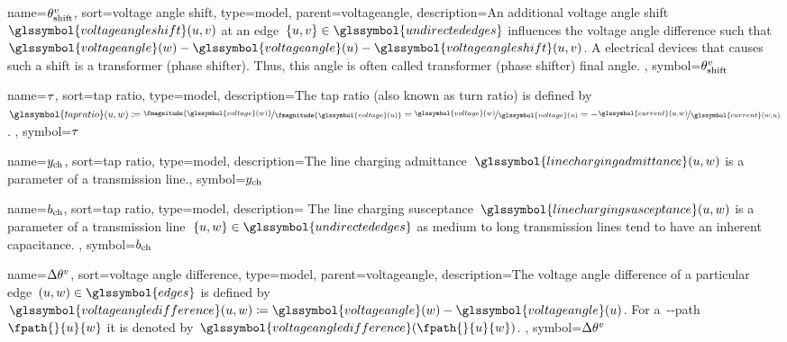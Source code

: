 {
    name={\ensuremath{\vangleshift}},
    sort={voltage angle shift},
    type={model},
    parent={voltageangle},
    description={An additional voltage angle
    shift~$\glssymbol{voltageangleshift}(\vertexa,\vertexb)$ at an edge~$
    \{\vertexa,\vertexb\}\in\glssymbol{undirectededges}$ influences the voltage
    angle difference such that~$\glssymbol{voltageangle}(\vertexc)-
    \glssymbol{voltageangle}(\vertexa)-\glssymbol{voltageangleshift}
    (\vertexa,\vertexb)$. A electrical devices that causes such a shift is a
    transformer (phase shifter). Thus, this angle is often called transformer
    (phase shifter) final angle.
    },
    symbol={\ensuremath{\vangleshift}}
}

{
    name={\ensuremath{\tapratio}},
    sort={tap ratio},
    type={model},
    description={The tap ratio (also known as turn ratio) is defined by~$\glssymbol{tapratio}(\vertexa,\vertexc)\coloneqq\nicefrac{\fmagnitude{
    \glssymbol{voltage}(\vertexc)}} {\fmagnitude{\glssymbol{voltage}(\vertexa)}} =
    \nicefrac{\glssymbol{voltage}(\vertexc)}{\glssymbol{voltage} (\vertexa)} = -
    \nicefrac{\glssymbol{current}(\vertexa, \vertexc)}{\glssymbol{current} (\vertexc, \vertexa)}$.
    },
    symbol={\ensuremath{\tapratio}}
}


{
    name={\ensuremath{\linechargingadmittance}},
    sort={tap ratio},
    type={model},
    description={The line charging
    admittance~$\glssymbol{linechargingadmittance}(\vertexa,\vertexc)$ is a
    parameter of a transmission line.},
    symbol={\ensuremath{\linechargingadmittance}}
}

{
    name={\ensuremath{\linechargingsusceptance}},
    sort={tap ratio},
    type={model},
    description={ The line charging
    susceptance~$\glssymbol{linechargingsusceptance}(\vertexa,\vertexc)$ is a
    parameter of a transmission
    line~$\{\vertexa,\vertexc\}\in\glssymbol{undirectededges}$ as medium to long
    transmission lines tend to have an inherent capacitance. 
    },
    symbol={\ensuremath{\linechargingsusceptance}}
}

{
    name={\ensuremath{ \deltaangle }},
    sort={voltage angle difference},
    type={model},
    parent={voltageangle},
    description={The voltage angle difference of a particular
    edge~$(\vertexa,\vertexc)\in\glssymbol{edges}$ is defined by~$
    \glssymbol{voltageangledifference}(\vertexa,\vertexc)\coloneqq 
    \glssymbol{voltageangle}(\vertexc) - \glssymbol{voltageangle}(\vertexa)$.
    For a~\vertexa-\vertexb-path~$\fpath{}{\vertexa}{\vertexc}$ it is denoted
    by~$\glssymbol{voltageangledifference}(\fpath{}{\vertexa}{\vertexc})$.
    },
    symbol={\ensuremath{ \deltaangle }}
}

